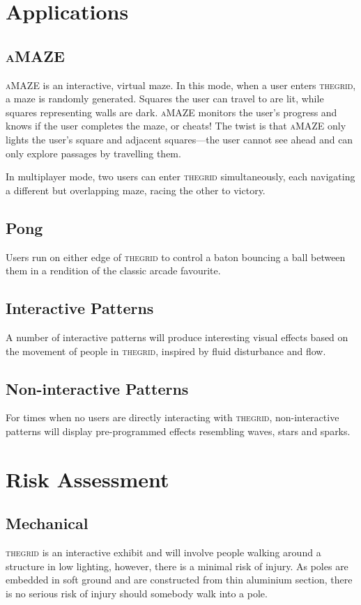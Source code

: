 \documentclass[12pt]{article} %
\newcommand{\thegrid}{\textsc{the\textperiodcentered grid}\xspace}
\newcommand{\amaze}{\textsc{aMAZE}\xspace}
\begin{document}
\section{Applications}
\subsection{\amaze}
\amaze is an interactive, virtual maze.  In this mode, when a user enters
\thegrid, a maze is randomly generated.  Squares the user can travel to are
lit, while squares representing walls are dark.  \amaze monitors the user's
progress and knows if the user completes the maze, or cheats!  The twist is
that \amaze only lights the user's square and adjacent squares---the user
cannot see ahead and can only explore passages by travelling them.

In multiplayer mode, two users can enter \thegrid simultaneously, each
navigating a different but overlapping maze, racing the other to victory.

\subsection{Pong}
Users run on either edge of \thegrid to control a baton bouncing a ball between
them in a rendition of the classic arcade favourite.

\subsection{Interactive Patterns}
A number of interactive patterns will produce interesting visual effects based
on the movement of people in \thegrid, inspired by fluid disturbance and flow.

\subsection{Non-interactive Patterns}
For times when no users are directly interacting with \thegrid, non-interactive
patterns will display pre-programmed effects resembling waves, stars and
sparks.

\clearpage
\section{Risk Assessment}
\subsection{Mechanical}
\thegrid is an interactive exhibit and will involve people walking around a
structure in low lighting, however, there is a minimal risk of injury.  As
poles are embedded in soft ground and are constructed from thin aluminium
section, there is no serious risk of injury should somebody walk into a pole.
\end{document}
